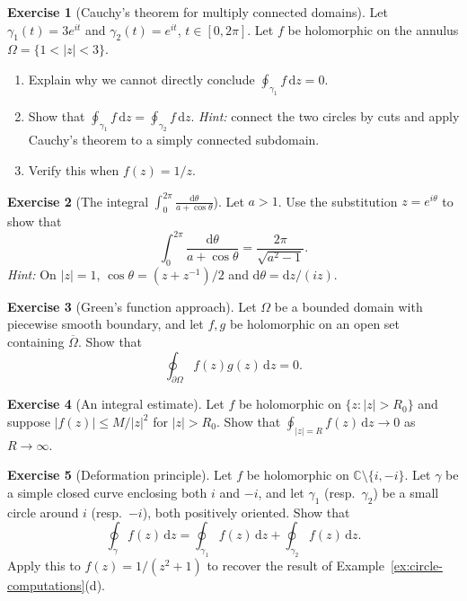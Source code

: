 \documentclass[12pt,a4paper,openany]{book}
\theoremstyle{definition}
\newtheorem{exercise}{Exercise}[chapter]
\theoremstyle{plain}
\theoremstyle{remark}
\newcommand{\C}{\mathbb{C}}
\newcommand{\dd}{\mathrm{d}}
\newcommand{\abs}[1]{\left|#1\right|}
\begin{document}
\begin{exercise}[Cauchy's theorem for multiply connected domains]\label{exo:multiply-connected}
Let $\gamma_1(t) = 3e^{it}$ and $\gamma_2(t) = e^{it}$, $t\in[0,2\pi]$.
Let $f$ be holomorphic on the annulus $\Omega = \{1<\abs{z}<3\}$.
\begin{enumerate}[label=\textup{(\alph*)}]
  \item Explain why we cannot directly conclude $\oint_{\gamma_1}f\,\dd z = 0$.
  \item Show that $\oint_{\gamma_1}f\,\dd z = \oint_{\gamma_2}f\,\dd z$.
    \textit{Hint:} connect the two circles by cuts and apply Cauchy's theorem
    to a simply connected subdomain.
  \item Verify this when $f(z) = 1/z$.
\end{enumerate}
\end{exercise}

\begin{exercise}[The integral $\int_0^{2\pi}\frac{\dd\theta}{a+\cos\theta}$]%
\label{exo:trig-integral}
Let $a>1$.  Use the substitution $z=e^{i\theta}$ to show that
\[
  \int_0^{2\pi}\frac{\dd\theta}{a+\cos\theta}
  = \frac{2\pi}{\sqrt{a^2-1}}.
\]
\textit{Hint:} On $\abs{z}=1$, $\cos\theta = (z+z^{-1})/2$ and
$\dd\theta = \dd z/(iz)$.
\end{exercise}

\begin{exercise}[Green's function approach]\label{exo:green-approach}
Let $\Omega$ be a bounded domain with piecewise smooth boundary, and let
$f,g$ be holomorphic on an open set containing $\overline{\Omega}$.
Show that
\[
  \oint_{\partial\Omega}f(z)g(z)\,\dd z = 0.
\]
\end{exercise}

\begin{exercise}[An integral estimate]\label{exo:integral-estimate}
Let $f$ be holomorphic on $\{z:\abs{z}>R_0\}$ and suppose
$\abs{f(z)}\le M/\abs{z}^2$ for $\abs{z}>R_0$.  Show that
$\oint_{\abs{z}=R}f(z)\,\dd z\to 0$ as $R\to\infty$.
\end{exercise}

\begin{exercise}[Deformation principle]\label{exo:deformation-principle}
Let $f$ be holomorphic on $\C\setminus\{i,-i\}$.  Let $\gamma$ be a simple
closed curve enclosing both $i$ and $-i$, and let $\gamma_1$ (resp.\ $\gamma_2$)
be a small circle around $i$ (resp.\ $-i$), both positively oriented.
Show that
\[
  \oint_\gamma f(z)\,\dd z
  = \oint_{\gamma_1}f(z)\,\dd z + \oint_{\gamma_2}f(z)\,\dd z.
\]
Apply this to $f(z) = 1/(z^2+1)$ to recover the result of
Example~\ref{ex:circle-computations}(d).
\end{exercise}
\end{document}
